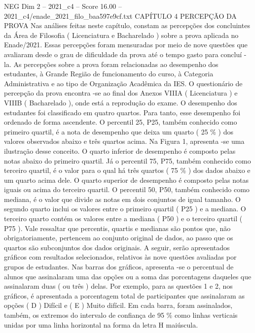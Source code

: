 \begin{textsample}{NEG Dim 2 – 2021\_c4 – Score 16.00 – 2021\_c4/enade\_2021\_filo\_baa597e9cf.txt}  \label{ex:f2_neg_396}
CAPÍTULO 4 PERCEPÇÃO DA PROVA Nas análises feitas neste capítulo, constam as percepções dos concluintes da Área de Filosofia ( Licenciatura e Bacharelado ) sobre a prova aplicada no Enade/2021.
Essas percepções foram mensuradas por meio de nove questões que avaliaram desde o grau de dificuldade da prova até o tempo gasto para concluí -la.
As percepções sobre a prova foram relacionadas ao desempenho dos estudantes, à Grande Região de funcionamento do curso, à Categoria Administrativa e ao tipo de Organização Acadêmica da IES.
O questionário de percepção da prova encontra -se ao final dos Anexos VIIIA ( Licenciatura ) e VIIIB ( Bacharelado ), onde está a reprodução do exame.
O desempenho dos estudantes foi classificado em quatro quartos.
Para tanto, esse desempenho foi ordenado de forma ascendente.
O percentil 25, P25, também conhecido como primeiro quartil, é a nota de desempenho que deixa um quarto ( 25 \% ) dos valores observados abaixo e três quartos acima.
Na Figura 1, apresenta -se uma ilustração desse conceito.
O quarto inferior de desempenho é composto pelas notas abaixo do primeiro quartil.
Já o percentil 75, P75, também conhecido como terceiro quartil, é o valor para o qual há três quartos ( 75 \% ) dos dados abaixo e um quarto acima dele.
O quarto superior de desempenho é composto pelas notas iguais ou acima do terceiro quartil.
O percentil 50, P50, também conhecido como mediana, é o valor que divide as notas em dois conjuntos de igual tamanho.
O segundo quarto inclui os valores entre o primeiro quartil ( P25 ) e a mediana.
O terceiro quarto contém os valores entre a mediana ( P50 ) e o terceiro quartil ( P75 ).
Vale ressaltar que percentis, quartis e medianas são pontos que, não obrigatoriamente, pertencem ao conjunto original de dados, ao passo que os quartos são subconjuntos dos dados originais.
A seguir, serão apresentados gráficos com resultados selecionados, relativos às nove questões avaliadas por grupos de estudantes.
Nas barras dos gráficos, apresenta -se o percentual de alunos que assinalaram uma das opções ou a soma das porcentagens daqueles que assinalaram duas ( ou três ) delas.
Por exemplo, para as questões 1 e 2, nos gráficos, é apresentada a porcentagem total de participantes que assinalaram as opções ( D ) Difícil e ( E ) Muito difícil.
Em cada barra, foram assinalados, também, os extremos do intervalo de confiança de 95 \% como linhas verticais unidas por uma linha horizontal na forma da letra H maiúscula.

\end{textsample}
